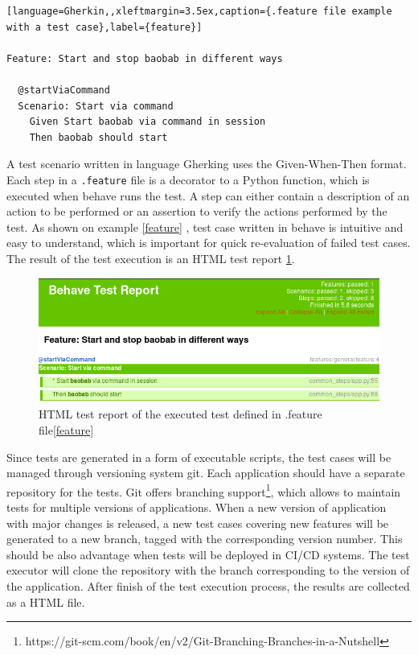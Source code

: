 \begin{lstlisting}[language=Gherkin,,xleftmargin=3.5ex,caption={.feature file example with a test case},label={feature}]

Feature: Start and stop baobab in different ways

  @startViaCommand
  Scenario: Start via command
    Given Start baobab via command in session
    Then baobab should start
\end{lstlisting}

A test scenario written in language Gherking uses the Given-When-Then format. Each step in a \verb|.feature| file is a decorator to a Python function, which is executed when behave runs the test.\cite{bdd} A step can either contain a description of an action to be performed or an assertion to verify the actions performed by the test. As shown on example \ref{feature} , test case written in behave is intuitive and easy to understand, which is important for quick re-evaluation of failed test cases. The result of the test execution is an HTML test report \ref{behave_report}.


\begin{figure}[hbt]
	\centering
	\includegraphics[width=1\textwidth]{obrazky-figures/behave_report.png}
	\caption{HTML test report of the executed test defined in .feature file\ref{feature}}
	\label{behave_report}
\end{figure}

Since tests are generated in a form of executable scripts, the test cases will be managed through versioning system git. Each application should have a separate repository for the tests. Git offers branching support\footnote{https://git-scm.com/book/en/v2/Git-Branching-Branches-in-a-Nutshell}, which allows to maintain tests for multiple versions of applications. When a new version of application with major changes is released, a new test cases covering new features will be generated to a new branch, tagged with the corresponding version number. This should be also advantage when tests will be deployed in CI/CD systems. The test executor will clone the repository with the branch corresponding to the version of the application. After finish of the test execution process, the results are collected as a HTML file. 

